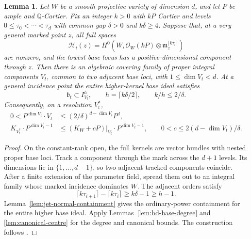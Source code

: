 \documentclass[12pt,a4paper,psamsfonts]{amsart}
\theoremstyle{definition}
\theoremstyle{plain}
\newtheorem{lemma}{Lemma}[section]
\newcommand{\OO}{\mathcal O}
\begin{document}
\begin{lemma}\label{lem:full-kernels}
Let $W$ be a smooth projective variety of dimension $d$, and let
$P$ be ample and $\mathbb{Q}$-Cartier. Fix an integer $k>0$ with $kP$ Cartier and levels
$0\le\tau_0<\cdots<\tau_d$ with common gap $\delta>0$ and
$k\delta\ge4$. Suppose that, at a very general marked point $z$,
all full spaces
\[
 \mathcal H_i(z)=H^0(W,\OO_W(kP)\otimes\mathfrak m_z^{\lceil k\tau_i\rceil})
\]
are nonzero, and the lowest base locus has a positive-dimensional
component through $z$. Then there is an algebraic covering family
of proper integral components $V_t$, common to two adjacent base
loci, with $1\le\dim V_t<d$. At a general incidence point the
entire higher-kernel base ideal satisfies
\[
 \mathfrak b_t\subset I_{V_t}^h,\qquad
 h=\lceil k\delta/2\rceil,\qquad k/h\le2/\delta.
\]
Consequently, on a resolution $V_t^*$,
\begin{equation}\label{eq:full-kernel-bounds}
 \begin{split}
 0<P^{\dim V_t}\cdot V_t&\le(2/\delta)^{d-\dim V_t}P^d,\\
 K_{V_t^*}\cdot P^{\dim V_t-1}&\le(K_W+cP)|_{V_t}\cdot P^{\dim V_t-1},
 \qquad 0<c\le2(d-\dim V_t)/\delta.
 \end{split}
\end{equation}
\end{lemma}
\begin{proof}
On the constant-rank open, the full kernels are vector bundles
with nested proper base loci. Track a component through the mark
across the $d+1$ levels. Its dimensions lie in
$\{1,\ldots,d-1\}$, so two adjacent tracked components coincide.
After a finite extension of the parameter field, spread them out
to an integral family whose marked incidence dominates $W$.
The adjacent orders satisfy
\[
 \lceil k\tau_{i+1}\rceil-\lceil k\tau_i\rceil
 \ge k\delta-1\ge h-1.
\]
Lemma~\ref{lem:jet-normal-containment} gives the ordinary-power
containment for the entire higher base ideal. Apply
Lemmas~\ref{lem:hd-base-degree} and \ref{lem:canonical-centre}
for the degree and canonical bounds. The construction follows
\cite[Lemmas~4.5--4.6]{NS}.
\end{proof}
\end{document}
